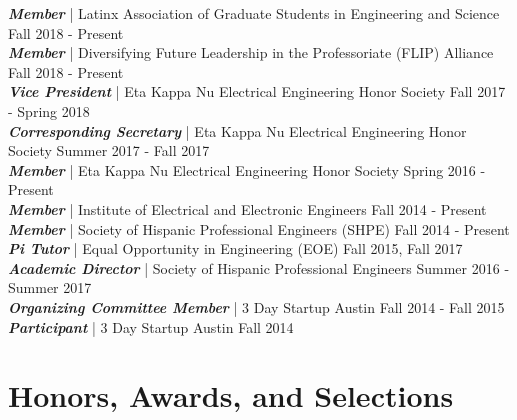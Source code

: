 \documentclass[line]{res}
\begin{document}
\begin{resume}
{\sl \textbf{Member}} | Latinx Association of Graduate Students in Engineering and Science \hfill Fall 2018 - Present
\\
{\sl \textbf{Member}} | Diversifying Future Leadership in the Professoriate (FLIP) Alliance \hfill Fall 2018 - Present
\\
{\sl \textbf{Vice President}} | Eta Kappa Nu Electrical Engineering Honor Society \hfill Fall 2017 - Spring 2018
\\
{\sl \textbf{Corresponding Secretary}} | Eta Kappa Nu Electrical Engineering Honor Society \hfill Summer 2017 - Fall 2017
\\
{\sl \textbf{Member}} | Eta Kappa Nu Electrical Engineering Honor Society \hfill Spring 2016 - Present
\\
{\sl \textbf{Member}} | Institute of Electrical and Electronic Engineers \hfill Fall 2014 - Present
\\
{\sl \textbf{Member}} | Society of Hispanic Professional Engineers (SHPE) \hfill Fall 2014 - Present
\\
{\sl \textbf{Pi Tutor}} | Equal Opportunity in Engineering (EOE) \hfill Fall 2015, Fall 2017
\\
{\sl \textbf{Academic Director}} | Society of Hispanic Professional Engineers \hfill Summer 2016 - Summer 2017
\\
{\sl \textbf{Organizing Committee Member}} | 3 Day Startup Austin \hfill Fall 2014 - Fall 2015
\\
{\sl \textbf{Participant}} | 3 Day Startup Austin \hfill Fall 2014

\section{\Large{Honors, Awards, and Selections}}
\label{sec:honors}
\vspace{2mm}


\end{resume}
\end{document}
